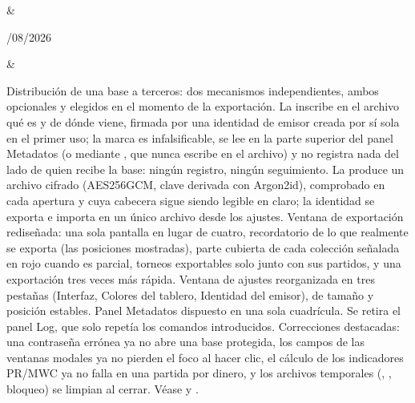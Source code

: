 \documentclass[letterpaper,10pt,spanish]{sphinxmanual}
\begin{document}
\begin{savenotes}
\begin{longtable}{}
&\begin{varwidth}[t]{}
/08/2026
\sphinxbeforeendvarwidth
\end{varwidth}%
&\begin{varwidth}[t]{}
\sphinxAtStartPar
Distribución de una base a terceros: dos mecanismos independientes, ambos opcionales y elegidos en el momento de la exportación. La  inscribe en el archivo qué es y de dónde viene, firmada por una identidad de emisor creada por sí sola en el primer uso; la marca es infalsificable, se lee en la parte superior del panel Metadatos (o mediante , que nunca escribe en el archivo) y no registra nada del lado de quien recibe la base: ningún registro, ningún seguimiento. La  produce un archivo  cifrado (AES\sphinxhyphen{}256\sphinxhyphen{}GCM, clave derivada con Argon2id), comprobado en cada apertura y cuya cabecera sigue siendo legible en claro; la identidad se exporta e importa en un único archivo desde los ajustes. Ventana de exportación rediseñada: una sola pantalla en lugar de cuatro, recordatorio de lo que realmente se exporta (las posiciones mostradas), parte cubierta de cada colección señalada en rojo cuando es parcial, torneos exportables solo junto con sus partidos, y una exportación tres veces más rápida. Ventana de ajustes reorganizada en tres pestañas (Interfaz, Colores del tablero, Identidad del emisor), de tamaño y posición estables. Panel Metadatos dispuesto en una sola cuadrícula. Se retira el panel Log, que solo repetía los comandos introducidos. Correcciones destacadas: una contraseña errónea ya no abre una base protegida, los campos de las ventanas modales ya no pierden el foco al hacer clic, el cálculo de los indicadores PR/MWC ya no falla en una partida por dinero, y los archivos temporales (, , bloqueo) se limpian al cerrar. Véase {\hyperref[\detokenize{manuel:diffusion-controlee}]{}} y {\hyperref[\detokenize{manuel:manuel}]{}}.
\sphinxbeforeendvarwidth
\end{varwidth}%
\\
\sphinxhline\begin{varwidth}[t]{}
\sphinxAtStartPar

\end{varwidth}
\end{longtable}
\end{savenotes}
\end{document}

